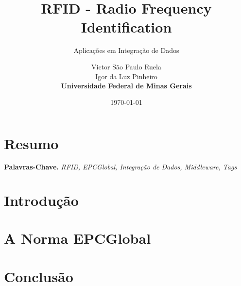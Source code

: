 \documentclass[a4paper,12pt,titlepage]{scrartcl}
\begin{document}
\title{RFID - Radio Frequency Identification}
\subtitle{Aplicações em Integração de Dados}
\author{Victor São Paulo Ruela \\ Igor da Luz Pinheiro \\ \textbf{Universidade Federal de Minas Gerais}}
\date{\today}

\maketitle

\tableofcontents
\newpage 
\listoffigures
\newpage
\listoftables
\newpage

\section*{Resumo}


\smallskip
\noindent \textbf{Palavras-Chave.} \textit{RFID, EPCGlobal, Integração de Dados, Middleware, Tags	}

\section{Introdução}

\section{A Norma EPCGlobal}

\section{Conclusão}


\newpage

\nocite{*}

\end{document}
